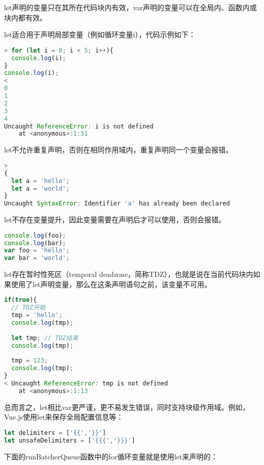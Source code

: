 let声明的变量只在其所在代码块内有效，var声明的变量可以在全局内、函数内或块内都有效。

let适合用于声明局部变量（例如循环变量i），代码示例如下：


\begin{lstlisting}[language=JavaScript]
> for (let i = 0; i < 5; i++){
  console.log(i);
}
console.log(i);
< 
0
1
2
3
4
Uncaught ReferenceError: i is not defined
    at <anonymous>:1:51
\end{lstlisting}

let不允许重复声明，否则在相同作用域内，重复声明同一个变量会报错。


\begin{lstlisting}[language=JavaScript]
> 
{
  let a = 'hello';
  let a = 'world';
}
Uncaught SyntaxError: Identifier 'a' has already been declared
\end{lstlisting}


let不存在变量提升，因此变量需要在声明后才可以使用，否则会报错。

\begin{lstlisting}[language=JavaScript]
console.log(foo);
console.log(bar);
var foo = 'hello';
var bar = 'world';
\end{lstlisting}

let存在暂时性死区（temporal deadzone，简称TDZ），也就是说在当前代码块内如果使用了let声明变量，那么在这条声明语句之前，该变量不可用。


\begin{lstlisting}[language=JavaScript]
if(true){
  // TDZ开始
  tmp = 'hello';
  console.log(tmp);
  
  let tmp; // TDZ结束
  console.log(tmp);
  
  tmp = 123;
  console.log(tmp);
}
< Uncaught ReferenceError: tmp is not defined
    at <anonymous>:1:13
\end{lstlisting}

总而言之，let相比var更严谨，更不易发生错误，同时支持块级作用域。例如，Vue.js使用let来保存全局配置信息等：






\begin{lstlisting}[language=JavaScript]
let delimiters = ['{{','}}']
let unsafeDelimiters = ['{{{','}}}']
\end{lstlisting}

下面的runBatcherQueue函数中的for循环变量就是使用let来声明的：






